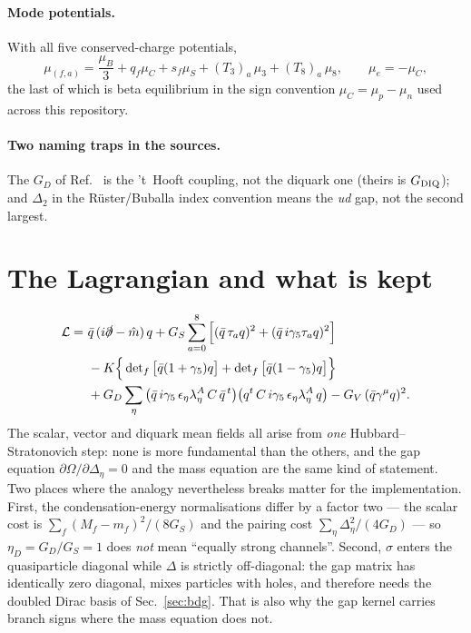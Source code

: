 \documentclass[aps,prc,onecolumn,superscriptaddress,nofootinbib,10pt]{revtex4-2}
\newcommand{\muB}{\mu_B}
\newcommand{\muC}{\mu_C}
\newcommand{\muS}{\mu_S}
\newcommand{\GS}{G_S}
\newcommand{\GD}{G_D}
\newcommand{\GV}{G_V}
\begin{document}
\paragraph{Mode potentials.} With all five conserved-charge potentials,
\begin{equation}
  \mu_{(f,a)} = \frac{\muB}{3} + q_f \muC + s_f \muS
              + (T_3)_a\,\mu_3 + (T_8)_a\,\mu_8 ,
  \qquad \mu_e = -\muC ,
  \label{eq:modemu}
\end{equation}
the last of which is beta equilibrium in the sign convention
$\muC = \mu_p - \mu_n$ used across this repository.

\paragraph{Two naming traps in the sources.} The $G_D$ of
Ref.~\cite{Steiner2002} is the 't~Hooft coupling, not the diquark one (theirs
is $G_{\rm DIQ}$); and $\Delta_2$ in the R\"uster/Buballa index convention
means the \emph{ud} gap, not the second largest.

\section{The Lagrangian and what is kept}
\label{sec:lagrangian}

\begin{align}
  \mathcal{L} =\ & \bar q\,(i\slashed\partial - \hat m)\,q
   + \GS \sum_{a=0}^{8}\Big[ (\bar q\,\tau_a q)^2
                           + (\bar q\, i\gamma_5 \tau_a q)^2 \Big]
   \nonumber\\
   & - K \Big\{ \det\nolimits_f \big[\bar q (1+\gamma_5) q\big]
              + \det\nolimits_f \big[\bar q (1-\gamma_5) q\big] \Big\}
   \nonumber\\
   & + \GD \sum_{\eta}
        \big(\bar q\, i\gamma_5\, \epsilon_\eta \lambda^A_\eta\, C\, \bar q^{\,t}\big)
        \big(q^{t}\, C\, i\gamma_5\, \epsilon_\eta \lambda^A_\eta\, q\big)
   - \GV\,(\bar q \gamma^\mu q)^2 .
  \label{eq:lagrangian}
\end{align}
The scalar, vector and diquark mean fields all arise from \emph{one}
Hubbard--Stratonovich step: none is more fundamental than the others, and the
gap equation $\partial\Omega/\partial\Delta_\eta = 0$ and the mass equation are
the same kind of statement. Two places where the analogy nevertheless breaks
matter for the implementation. First, the condensation-energy normalisations
differ by a factor two --- the scalar cost is
$\sum_f (M_f-m_f)^2/(8\GS)$ and the pairing cost
$\sum_\eta \Delta_\eta^2/(4\GD)$ --- so $\eta_D = \GD/\GS = 1$ does
\emph{not} mean ``equally strong channels''. Second, $\sigma$ enters the
quasiparticle diagonal while $\Delta$ is strictly off-diagonal: the gap matrix
has identically zero diagonal, mixes particles with holes, and therefore needs
the doubled Dirac basis of Sec.~\ref{sec:bdg}. That is also why the gap kernel
carries branch signs where the mass equation does not.
\end{document}
